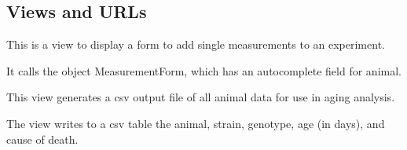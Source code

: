 \documentclass[letterpaper,10pt,english]{sphinxmanual}
\begin{document}
\subsection{Views and URLs}
\label{api:id1}\label{api:module-mousedb.data.views}

\begin{fulllineitems}
\label{api:mousedb.data.views.add_measurement}
This is a view to display a form to add single measurements to an experiment.

It calls the object MeasurementForm, which has an autocomplete field for animal.

\end{fulllineitems}


\begin{fulllineitems}
\label{api:mousedb.data.views.aging_csv}
This view generates a csv output file of all animal data for use in aging analysis.

The view writes to a csv table the animal, strain, genotype, age (in days), and cause of death.

\end{fulllineitems}


\begin{fulllineitems}
\label{api:mousedb.data.views.experiment_detail}
\end{fulllineitems}


\begin{fulllineitems}
\label{api:mousedb.data.views.experiment_detail_all}
\end{fulllineitems}

\end{document}
